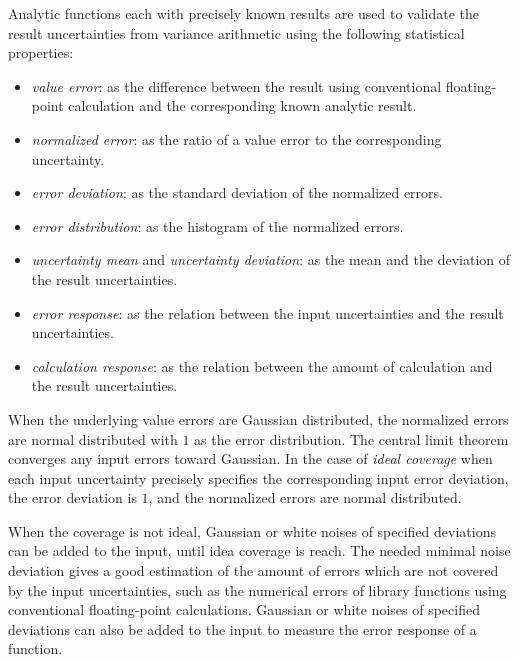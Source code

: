 \documentclass[twoside]{article}
\numberwithin{equation}{section}
\begin{document}
Analytic functions each with precisely known results are used to validate the result uncertainties from variance arithmetic using the following statistical properties: 
\begin{itemize}

\item \emph{value error}: as the difference between the result using conventional floating-point calculation and the corresponding known analytic result.

\item \emph{normalized error}: as the ratio of a value error to the corresponding uncertainty.

\item \emph{error deviation}: as the standard deviation of the normalized errors.

\item \emph{error distribution}: as the histogram of the normalized errors.

\item \emph{uncertainty mean} and \emph{uncertainty deviation}: as the mean and the deviation of the result uncertainties.

\item \emph{error response}: as the relation between the input uncertainties and the result uncertainties.

\item \emph{calculation response}: as the relation between the amount of calculation and the result uncertainties.

\end{itemize}
When the underlying value errors are Gaussian distributed, the normalized errors are normal distributed with $1$ as the error distribution.
The central limit theorem converges any input errors toward Gaussian.
In the case of \emph{ideal coverage} when each input uncertainty precisely specifies the corresponding input error deviation, the error deviation is $1$, and the normalized errors are normal distributed.

When the coverage is not ideal, Gaussian or white noises of specified deviations can be added to the input, until idea coverage is reach.
The needed minimal noise deviation gives a good estimation of the amount of errors which are not covered by the input uncertainties, such as the numerical errors of library functions using conventional floating-point calculations.
Gaussian or white noises of specified deviations can also be added to the input to measure the error response of a function.
\end{document}
